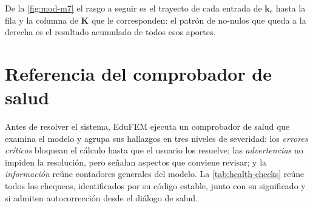 De la \autoref{fig:mod-m7} el rasgo a seguir es el trayecto de cada entrada de $\bm{k}_e$ hasta la fila y la columna de $\bm{K}$ que le corresponden: el patrón de no-nulos que queda a la derecha es el resultado acumulado de todos esos aportes.


\section{Referencia del comprobador de salud}
\label{sec:health-checks}

Antes de resolver el sistema, EduFEM ejecuta un comprobador de salud que examina el modelo y agrupa sus hallazgos en tres niveles de severidad: los \emph{errores críticos} bloquean el cálculo hasta que el usuario los resuelve; las \emph{advertencias} no impiden la resolución, pero señalan aspectos que conviene revisar; y la \emph{información} reúne contadores generales del modelo. La \autoref{tab:health-checks} reúne todos los chequeos, identificados por su código estable, junto con su significado y si admiten autocorrección desde el diálogo de salud.


